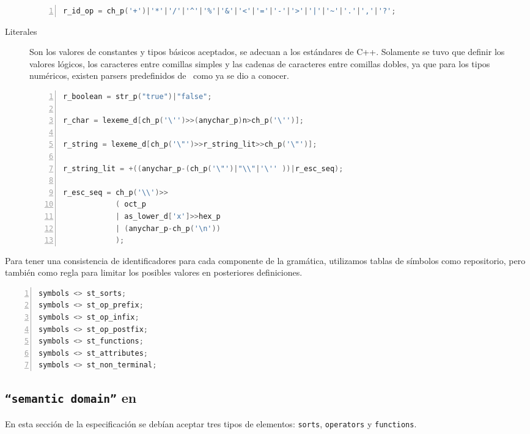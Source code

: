 \begin{description}
\begin{lstlisting}[language=C++, basicstyle=\scriptsize, numbers=left, numbersep=5pt, numberstyle=\tiny]
r_id_op = ch_p('+')|'*'|'/'|'^'|'%'|'&'|'<'|'='|'-'|'>'|'|'|'~'|'.'|','|'?';
\end{lstlisting}

\item [Literales] Son los valores de constantes y tipos básicos aceptados, se adecuan a los estándares de C++. Solamente se tuvo que definir los valores lógicos, los caracteres entre comillas simples y las cadenas de caracteres entre comillas dobles, ya que para los tipos numéricos, existen parsers predefinidos de \spirit\ como ya se dio a conocer.

\begin{lstlisting}[language=C++, basicstyle=\scriptsize, numbers=left, numbersep=5pt, numberstyle=\tiny]
r_boolean = str_p("true")|"false";

r_char = lexeme_d[ch_p('\'')>>(anychar_p)n>ch_p('\'')];

r_string = lexeme_d[ch_p('\"')>>r_string_lit>>ch_p('\"')];

r_string_lit = +((anychar_p-(ch_p('\"')|"\\"|'\'' ))|r_esc_seq);

r_esc_seq = ch_p('\\')>>
            ( oct_p
            | as_lower_d['x']>>hex_p
            | (anychar_p-ch_p('\n'))
            );               
\end{lstlisting}
\end{description}

Para tener una consistencia de identificadores para cada componente de la gramática, utilizamos tablas de símbolos como repositorio, pero también como regla para limitar los posibles valores en posteriores definiciones.

\begin{lstlisting}[language=C++, basicstyle=\scriptsize,numbers=left, numbersep=5pt, numberstyle=\tiny]
symbols <> st_sorts;
symbols <> st_op_prefix;
symbols <> st_op_infix;
symbols <> st_op_postfix;
symbols <> st_functions;
symbols <> st_attributes;
symbols <> st_non_terminal;
\end{lstlisting}

\subsection{\texttt{``semantic domain''} en \spirit}

En esta sección de la especificación se debían aceptar tres tipos de elementos: \texttt{sorts}, \texttt{operators} y \texttt{functions}.

